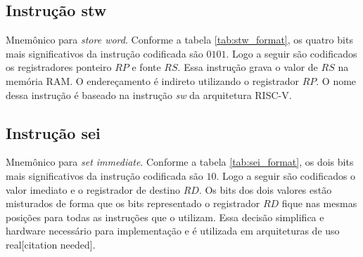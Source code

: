 \documentclass[a4paper, 12pt]{article}
\begin{document}
\subsection{Instrução stw}

\begin{table}[ht]
	\centering
	\caption{Formato da instrução codificada \textit{ldw}}
	\label{tab:stw_format}
\end{table}
\par

Mnemônico para \textit{store word}. Conforme a tabela \ref{tab:stw_format}, os 
quatro bits mais significativos da instrução codificada são $0101$.
Logo a seguir são codificados os registradores ponteiro $RP$ e fonte $RS$.
Essa instrução grava o valor de $RS$ na memória RAM.
O endereçamento é indireto utilizando o registrador $RP$.
O nome dessa instrução é baseado na instrução \textit{sw} da arquitetura RISC-V.

\subsection{Instrução sei}

\begin{table}[ht]
	\centering
	\caption{Formato da instrução codificada \textit{sei}}
	\label{tab:sei_format}
\end{table}

\par
Mnemônico para \textit{set immediate}. Conforme a tabela \ref{tab:sei_format}, os 
dois bits mais significativos da instrução codificada são $10$.
Logo a seguir são codificados o valor imediato e o registrador de destino $RD$.
Os bits dos dois valores estão misturados de forma que os bits representado
o registrador $RD$ fique nas mesmas posições para todas as instruções que o utilizam.
Essa decisão simplifica e hardware necessário para implementação e 
é utilizada em arquiteturas de uso real[citation needed].
\end{document}
